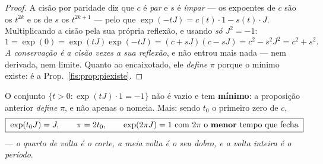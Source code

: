 \documentclass[livro.tex]{subfiles}
\begin{document}
\begin{proof}
A cisão por paridade diz que $c$ é \emph{par} e $s$ é \emph{ímpar} --- os
expoentes de $c$ são os $t^{2k}$ e os de $s$ os $t^{2k+1}$ --- pelo que
$\exp(-tJ)=c(t)\cdot1-s(t)\cdot J$. Multiplicando a cisão pela sua própria
reflexão, e usando \emph{só} $J^{2}=-1$:
\[
1=\exp(0)=\exp(tJ)\exp(-tJ)=(c+sJ)(c-sJ)=c^{2}-s^{2}J^{2}=c^{2}+s^{2}.
\]
\emph{A conservação é a cisão vezes a sua reflexão}, e não entrou mais nada ---
nem derivada, nem limite. Quanto ao encaixotado, ele \emph{define} $\pi$ porque o
mínimo existe: é a Prop.~\ref{fis:prop:piexiste}.
\end{proof}

\begin{proposicao}\label{fis:prop:piexiste}
O conjunto $\{t>0:\exp(tJ)\cdot1=-1\}$ não é vazio e tem \textbf{mínimo}: a
proposição anterior \emph{define} $\pi$, e não apenas o nomeia. Mais: sendo
$t_0$ o primeiro zero de $c$,
\[
\boxed{\;\exp(t_0J)=J,\qquad \pi=2t_0,\qquad
\exp(2\pi J)=1\ \text{com $2\pi$ o \textbf{menor} tempo que fecha}\;}
\]
--- \emph{o quarto de volta é o corte, a meia volta é o seu dobro, e a volta
inteira é o período}.
\end{proposicao}
\end{document}
